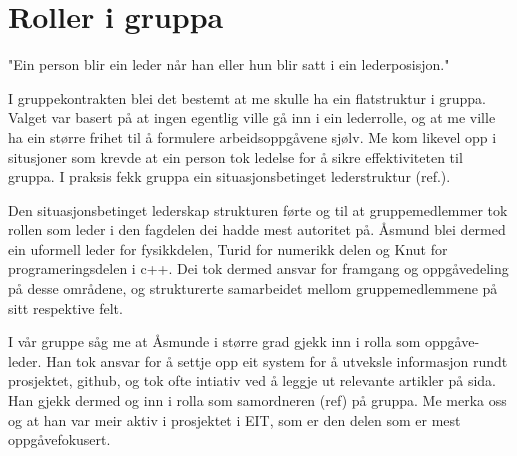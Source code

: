 \section{Roller i gruppa}
"Ein person blir ein leder når han eller hun blir satt i ein lederposisjon."

I gruppekontrakten blei det bestemt at me skulle ha ein flatstruktur i gruppa. Valget var basert på at ingen egentlig ville gå inn i ein lederrolle, og at me ville ha ein større frihet til å formulere arbeidsoppgåvene sjølv. Me kom likevel opp i situsjoner som krevde at ein person tok ledelse for å sikre effektiviteten til gruppa. I praksis fekk gruppa ein situasjonsbetinget lederstruktur (ref.).

Den situasjonsbetinget lederskap strukturen førte og til at gruppemedlemmer tok rollen som leder i den fagdelen dei hadde mest autoritet på. Åsmund blei dermed ein uformell leder for fysikkdelen, Turid for numerikk delen og Knut for programeringsdelen i c++. Dei tok dermed ansvar for framgang og oppgåvedeling på desse områdene, og strukturerte samarbeidet mellom gruppemedlemmene på sitt respektive felt. 

I vår gruppe såg me at Åsmunde i større grad gjekk inn i rolla som oppgåve-leder. Han tok ansvar for å settje opp eit system for å utveksle informasjon rundt prosjektet, github, og tok ofte intiativ ved å leggje ut relevante artikler på sida. Han gjekk dermed og inn i rolla som  samordneren (ref) på gruppa. Me merka oss og at han var meir aktiv i prosjektet i EIT, som er den delen som er mest oppgåvefokusert. 

